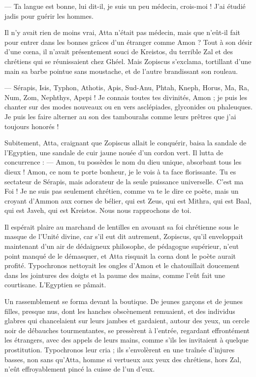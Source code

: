 \documentclass[a4paper, 11pt, oneside, polutonikogreek, french]{article}
\begin{document}
--- Ta langue est bonne, lui dit-il, je suis un peu médecin, crois-moi ! J'ai étudié jadis pour guérir les hommes.

Il n'y avait rien de moins vrai, Atta n'était pas médecin, mais que n'eût-il fait pour entrer dans les bonnes grâces d'un étranger comme Amon ? Tout à son désir d'une cœna, il n'avait présentement souci de Kreistos, du terrible Zal et des chrétiens qui se réunissaient chez Ghéel. Mais Zopiscus s'exclama, tortillant d'une main sa barbe pointue sans moustache, et de l'autre brandissant son rouleau.

--- Sérapis, Isis, Typhon, Athotis, Apis, Sud-Anu, Phtah, Kneph, Horus, Ma, Ra, Num, Zom, Nephthys, Apepi ! Je connais toutes tes divinités, Amon ; je puis les chanter sur des modes nouveaux ou en vers asclépiades, glyconides ou phaleuques. Je puis les faire alterner au son des tambourahs comme leurs prêtres que j'ai toujours honorés !

Subitement, Atta, craignant que Zopiscus allait le conquérir, baisa la sandale de l'Egyptien, une sandale de cuir jaune nouée d'un cordon vert. Il lutta de concurrence : --- Amon, tu possèdes le nom du dieu unique, absorbant tous les dieux ! Amon, ce nom te porte bonheur, je le vois à ta face florissante. Tu es sectateur de Sérapis, mais adorateur de la seule puissance universelle. C'est ma Foi ! Je ne suis pas seulement chrétien, comme va te le dire ce poète, mais un croyant d'Ammon aux cornes de bélier, qui est Zeus, qui est Mithra, qui est Baal, qui est Javeh, qui est Kreistos. Nous nous rapprochons de toi.

Il espérait plaire au marchand de lentilles en avouant sa foi chrétienne sous le masque de l'Unité divine, car s'il eut dit autrement, Zopiscus, qu'il enveloppait maintenant d'un air de dédaigneux philosophe, de pédagogue supérieur, n'eut point manqué de le démasquer, et Atta risquait la cœna dont le poète aurait profité. Typochronos nettoyait les ongles d'Amon et le chatouillait doucement dans les jointures des doigts et la paume des mains, comme l'eût fait une courtisane. L'Egyptien se pâmait.

Un rassemblement se forma devant la boutique. De jeunes garçons et de jeunes filles, presque nus, dont les hanches obscènement remuaient, et des individus glabres qui chancelaient sur leurs jambes et gardaient, autour des yeux, un cercle noir de débauches tourmentantes, se pressèrent à l'entrée, regardant effrontément les étrangers, avec des appels de leurs mains, comme s'ils les invitaient à quelque prostitution. Typochronos leur cria ; ils s'envolèrent en une traînée d'injures basses, non sans qu'Atta, homme si vertueux aux yeux des chrétiens, hors Zal, n'eût effroyablement pincé la cuisse de l'un d'eux.
\end{document}
